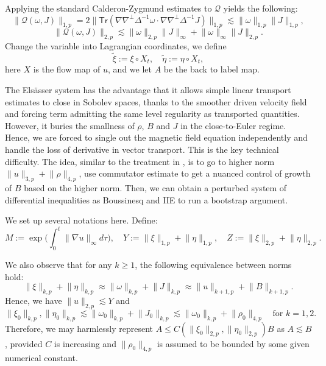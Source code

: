 \documentclass[12pt,letterpaper]{article}
\theoremstyle{plain}
\begin{document}
Applying the standard Calderon-Zygmund estimates to $\mathscr Q$ yields the following:
\begin{equation*}
\lVert\mathscr  Q(\omega,J)\rVert_{1,p}=2\lVert\mathsf{Tr}(\nabla\nabla^\perp\Delta^{-1}\omega\cdot \nabla\nabla^\perp \Delta^{-1}J)  \rVert_{1,p}\lesssim \lVert\omega\rVert_{1,p}\lVert  J\rVert_{1,p},
\end{equation*}
\begin{equation*}
\lVert\mathscr  Q(\omega,J)\rVert_{2,p}\lesssim \lVert\omega\rVert_{2,p}\lVert  J\rVert_{\infty}+\lVert\omega\rVert_\infty \lVert J\rVert_{2,p}.
\end{equation*}                                                                   
Change the variable into Lagrangian coordinates, we define
\begin{equation}\label{Lagrangian variables}
    \tilde\xi:=\xi\circ X_t,\quad \tilde\eta:=\eta\circ X_t,
\end{equation}
here $X$ is the flow map of $u$, and we let $A$ be the back to label map. 

The Els\"asser system has the advantage that it allows simple linear transport estimates to close in Sobolev spaces, thanks to the smoother driven velocity field and forcing term admitting the same level regularity as transported quantities. However, it buries the smallness of $\rho$, $B$ and $J$ in the close-to-Euler regime. Hence, we are forced to single out the magnetic field equation independently and handle the loss of derivative in vector transport. This is the key technical difficulty. The idea, similar to the treatment in \cite{CobbFanelli2023}, is to go to higher norm $\lVert u\rVert_{3,p}+\lVert\rho\rVert_{4,p}$, use commutator estimate to get a nuanced control of growth of $B$ based on the higher norm. Then, we can obtain a perturbed system of differential inequalities as Boussinesq and IIE to run a bootstrap argument. 

We set up several notations here. Define:
\begin{equation*}
 M:=\exp\bigg(\int_0^t \lVert\nabla u\rVert_\infty d\tau\bigg),\quad Y:=\lVert \xi\rVert_{1,p}+\lVert\eta\rVert_{1,p},\quad Z:=\lVert\xi\rVert_{2,p}+\lVert \eta\rVert_{2,p}.    
\end{equation*}

We also observe that for any $k\ge 1$, the following equivalence between norms hold:
\begin{equation}\label{equivalence of norms}
 \lVert\xi\rVert_{k,p}+\lVert \eta\rVert_{k,p}\approx \lVert\omega\rVert_{k,p}+\lVert J\rVert_{k,p}\approx \lVert u\rVert_{k+1,p}+\lVert B\rVert_{k+1,p}.   
\end{equation}
Hence, we have $\lVert u\rVert_{2,p}\lesssim Y$ and 
\begin{equation*}
 \lVert\xi_0\rVert_{k,p}, \lVert\eta_0\rVert_{k,p}\lesssim \lVert\omega_0\rVert_{k,p}+\lVert J_0\rVert_{k,p}\lesssim \lVert\omega_0\rVert_{k,p}+\lVert \rho_0\rVert_{4,p}\quad\text{for }k=1,2.
\end{equation*}
Therefore, we may harmlessly represent $A\le C(\lVert\xi_0\rVert_{2,p},\lVert\eta_0\rVert_{2,p})B$ as $A\lesssim B$, provided $C$ is increasing and $\lVert \rho_0\rVert_{4,p}$ is assumed to be bounded by some given numerical constant.
\end{document}
